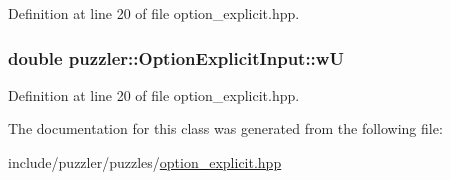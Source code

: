 Definition at line 20 of file option\+\_\+explicit.\+hpp.

\hypertarget{a00019_aa88914b775e5c395165a60ff586f656d}{}
\subsubsection[{w\+U}]{\setlength{\rightskip}{0pt plus 5cm}double puzzler\+::\+Option\+Explicit\+Input\+::w\+U}\label{a00019_aa88914b775e5c395165a60ff586f656d}


Definition at line 20 of file option\+\_\+explicit.\+hpp.



The documentation for this class was generated from the following file\+:\begin{DoxyCompactItemize}
\item 
include/puzzler/puzzles/\hyperlink{a00132}{option\+\_\+explicit.\+hpp}\end{DoxyCompactItemize}
